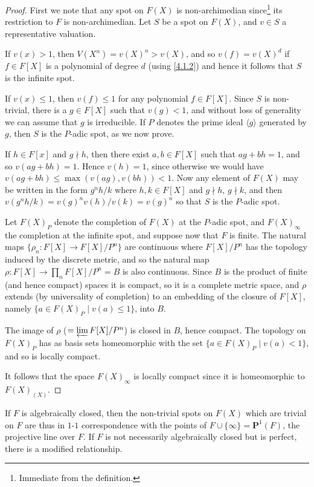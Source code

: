 \documentclass[10pt,leqno]{article}
\theoremstyle{definition}
\def\<{\langle}
\def\>{\rangle}
\def\PP{\mathbf{P}}
\def\fnthni{Immediate from the definition.}
\begin{document}
\begin{proof}
First we note that any spot on $F(X)$ is non-archimedian since\footnote{\fnthni} its restriction to $F$ is non-archimedian.
Let $S$ be a spot on $F(X)$, and $v \in S$ a representative valuation.

If $v(x) > 1$, then $V(X^n) = v(X)^n > v(X)$, and so $v(f) = v(X)^d$ if $f \in F[X]$ is a polynomial of degree $d$ (using \ref{4.1.2}) and hence it follows that $S$ is the infinite spot.

If $v(x) \leq 1$, then $v(f) \leq 1$ for any polynomial $f \in F[X]$.
Since $S$ is non-trivial, there is a $g \in F[X]$ such that $v(g) < 1$, and without loss of generality we can assume that $g$ is irreducible.
If $P$ denotes the prime ideal $\< g \>$ generated by $g$, then $S$ is the $P$-adic spot, as we now prove.

If $h \in F[x]$ and $g \nmid h$, then there exist $a,b \in F[X]$ such that $ag + bh = 1$, and so $v(ag + bh) = 1$.
Hence $v(h) = 1$, since otherwise we would have $v(ag + bh) \leq \max(v(ag), v(bh)) < 1$.
Now any element of $F(X)$ may be written in the form $g^nh/k$ where $h,k \in F[X]$ and $g \nmid h$, $g \nmid k$, and then $v(g^nh/k) = v(g)^n v(h) / v(k) = v(g)^n$ so that $S$ is the $P$-adic spot.

Let $F(X)_P$ denote the completion of $F(X)$ at the $P$-adic spot, and $F(X)_\infty$ the completion at the infinite spot, and suppose now that $F$ is finite.
The natural maps $\{ \rho_n : F[X] \to F[X]/P^n\}$ are continuous where $F[X]/P^n$ has the topology induced by the discrete metric, and so the natural map $\rho : F[X] \to \prod_{n} F[X] / P^n = B$ is also continuous.
Since $B$ is the product of finite (and hence compact) spaces it is compact, so it is a complete metric space, and $\rho$ extends (by universality of completion) to an embedding of the closure of $F[X]$, namely $\{ a \in F(X)_P \mid v(a) \leq 1\}$, into $B$.

The image of $\rho$ ($= \varprojlim F[X] / P^n$) is closed in $B$, hence compact.
The topology on $F(X)_P$ has as basis sets homeomorphic with the set $\{a \in F(X)_P \mid v(a) < 1 \}$, and so is locally compact.

It follows that the space $F(X)_\infty$ is locally compact since it is homeomorphic to $F(X)_{(X)}$.
\end{proof}


If $F$ is algebraically closed, then the non-trivial spots on $F(X)$ which are trivial on $F$ are thus in $1$-$1$ correspondence with the points of $F \cup \{\infty\} = \PP^1(F)$, the projective line over $F$.
If $F$ is not necessarily algebraically closed but is perfect, there is a modified relationship.
\end{document}
